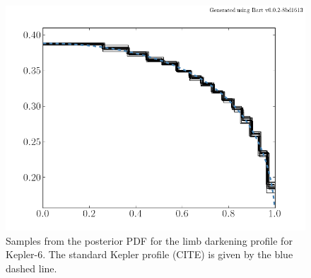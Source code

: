 \documentclass[12pt,preprint]{aastex}
\newcommand{\figlabel}[1]{\label{fig:#1}}
\begin{document}
\begin{figure}[htbp]
    \begin{center}
        \includegraphics[width=\textwidth]{figures/k6-ldp.png}
    \end{center}
    \caption{Samples from the posterior PDF for the limb darkening profile for
        Kepler-6. The standard Kepler profile (CITE) is given by the blue
        dashed line. \figlabel{k6-ldp}}
\end{figure}
\end{document}
